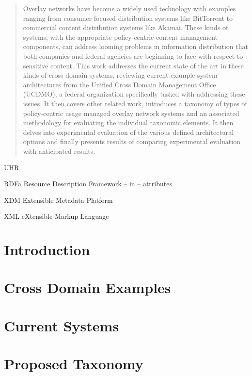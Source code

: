 \documentclass[botnum,fleqn,final]{unmeethesis}
\begin{document}
\begin{abstract}
Overlay networks have become a widely used technology with examples ranging from consumer focused distribution systems like BitTorrent to commercial content distribution systems like Akamai.  These kinds of systems, with the appropriate policy-centric content management components, can address looming problems in information distribution that both companies and federal agencies are beginning to face with respect to sensitive content.  This work addresses the current state of the art in these kinds of cross-domain systems, reviewing current example system architectures from the Unified Cross Domain Management Office (UCDMO), a federal organization specifically tasked with addressing these issues.  It then covers other related work, introduces a taxonomy of types of policy-centric usage managed overlay network systems and an associated methodology for evaluating the individual taxonomic elements.  It then delves into experimental evaluation of the various defined architectural options and finally presents results of comparing experimental evaluation with anticipated results. 
\end{abstract}

\tableofcontents
\listoffigures
\listoftables

\begin{glossary}{UHR}
   \item[RDFa] Resource Description Framework -- in -- attributes
   \item[XDM] Extensible Metadata Platform
   \item[XML] eXtensible Markup Language
\end{glossary}

\mainmatter


\chapter{Introduction}


\chapter{Cross Domain Examples}


\chapter{Current Systems}


\chapter{Proposed Taxonomy}


\pagebreak



\end{document}
